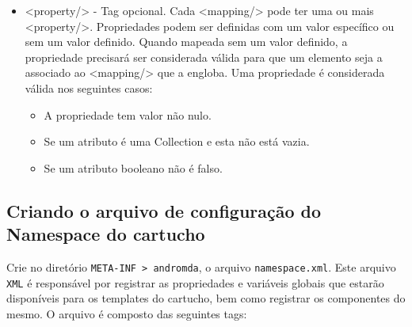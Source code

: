 \begin{itemize}
  \item <property/> - Tag opcional. Cada <mapping/> pode ter uma ou mais
  <property/>. Propriedades podem ser definidas com um valor específico ou sem
  um valor definido. Quando mapeada sem um valor definido, a propriedade
  precisará ser considerada válida para que um elemento seja a associado ao
  <mapping/> que a engloba. Uma propriedade é considerada válida nos seguintes
  casos:
  
  \begin{itemize}
    \item A propriedade tem valor não nulo.
    \item Se um atributo é uma Collection e esta não está vazia.
    \item Se um atributo booleano não é falso.
  \end{itemize}
  
\end{itemize}

\subsection{Criando o arquivo de configuração do Namespace do cartucho}
Crie no diretório \texttt{META-INF > andromda}, o arquivo
\texttt{namespace.xml}. Este arquivo \texttt{XML} é responsável por registrar as
propriedades e variáveis globais que estarão disponíveis para os templates do
cartucho, bem como registrar os componentes do mesmo. O arquivo é composto das
seguintes tags:

